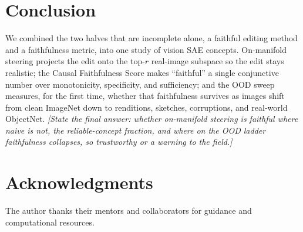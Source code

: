 \documentclass[conference]{IEEEtran}
\newcommand{\pending}[1]{\textcolor{pendingcolor}{\textit{[#1]}}}
\begin{document}
\section{Conclusion}
We combined the two halves that are incomplete alone, a faithful editing method and a faithfulness metric, into one study of vision SAE concepts. On-manifold steering projects the edit onto the top-$r$ real-image subspace so the edit stays realistic; the Causal Faithfulness Score makes ``faithful'' a single conjunctive number over monotonicity, specificity, and sufficiency; and the OOD sweep measures, for the first time, whether that faithfulness survives as images shift from clean ImageNet down to renditions, sketches, corruptions, and real-world ObjectNet. \pending{State the final answer: whether on-manifold steering is faithful where naive is not, the reliable-concept fraction, and where on the OOD ladder faithfulness collapses, so trustworthy or a warning to the field.}

\section*{Acknowledgments}
The author thanks their mentors and collaborators for guidance and computational resources.
\end{document}
